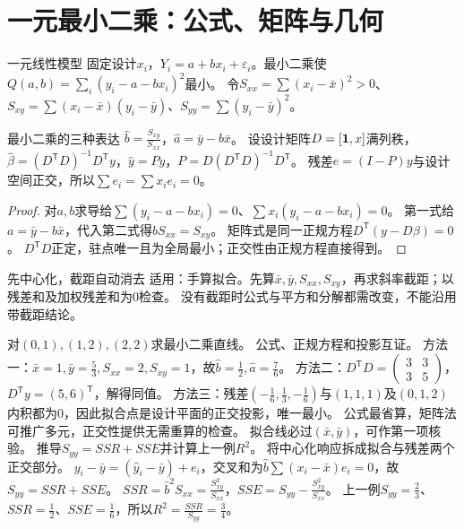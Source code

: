 \section{一元最小二乘：公式、矩阵与几何}\label{sec:93}
\begin{definition}{一元线性模型}
固定设计$x_i$，$Y_i=a+bx_i+\varepsilon_i$。最小二乘使$Q(a,b)=\sum_i(y_i-a-bx_i)^2$最小。
令$S_{xx}=\sum(x_i-\bar x)^2>0$、$S_{xy}=\sum(x_i-\bar x)(y_i-\bar y)$、$S_{yy}=\sum(y_i-\bar y)^2$。
\end{definition}
\begin{theorem}{最小二乘的三种表达}
$\hat b=\frac{S_{xy}}{S_{xx}}$，$\hat a=\bar y-\hat b\bar x$。
设设计矩阵$D=[\mathbf1,x]$满列秩，$\hat\beta=(D^\mathsf TD)^{-1}D^\mathsf Ty$，$\hat y=Py$，$P=D(D^\mathsf TD)^{-1}D^\mathsf T$。
残差$e=(I-P)y$与设计空间正交，所以$\sum e_i=\sum x_ie_i=0$。
\end{theorem}
\begin{proof}
对$a,b$求导给$\sum(y_i-a-bx_i)=0$、$\sum x_i(y_i-a-bx_i)=0$。
第一式给$a=\bar y-b\bar x$，代入第二式得$bS_{xx}=S_{xy}$。
矩阵式是同一正规方程$D^\mathsf T(y-D\beta)=0$。
$D^\mathsf TD$正定，驻点唯一且为全局最小；正交性由正规方程直接得到。
\end{proof}
\begin{method}{先中心化，截距自动消去}
适用：手算拟合。先算$\bar x,\bar y,S_{xx},S_{xy}$，再求斜率截距；以残差和及加权残差和为0检查。
没有截距时公式与平方和分解都需改变，不能沿用带截距结论。
\end{method}
{对$(0,1),(1,2),(2,2)$求最小二乘直线。}
{公式、正规方程和投影互证。}
{方法一：$\bar x=1,\bar y=\frac{5}{3},S_{xx}=2,S_{xy}=1$，故$\hat b=\frac{1}{2},\hat a=\frac{7}{6}$。
方法二：$D^\mathsf TD=\begin{pmatrix}3&3\\3&5\end{pmatrix}$，$D^\mathsf Ty=(5,6)^\mathsf T$，解得同值。
方法三：残差$(-\frac{1}{6},\frac{1}{3},-\frac{1}{6})$与$(1,1,1)$及$(0,1,2)$内积都为0，因此拟合点是设计平面的正交投影，唯一最小。}
{公式最省算，矩阵法可推广多元，正交性提供无需重算的检查。}
{拟合线必过$(\bar x,\bar y)$，可作第一项核验。}
{推导$S_{yy}=SSR+SSE$并计算上一例$R^2$。}
{将中心化响应拆成拟合与残差两个正交部分。}
{$y_i-\bar y=(\hat y_i-\bar y)+e_i$，交叉和为$\hat b\sum(x_i-\bar x)e_i=0$，故$S_{yy}=SSR+SSE$。
$SSR=\hat b^2S_{xx}=\frac{S_{xy}^2}{S_{xx}}$，$SSE=S_{yy}-\frac{S_{xy}^2}{S_{xx}}$。
上一例$S_{yy}=\frac{2}{3}$、$SSR=\frac{1}{2}$、$SSE=\frac{1}{6}$，所以$R^2=\frac{SSR}{S_{yy}}=\frac{3}{4}$。}
